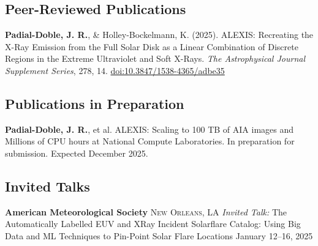 \documentclass[11pt,a4paper]{article}
\begin{document}
\spacedhrule{0.5em}{-0.4em}



\subsection*{Peer-Reviewed Publications}

\begin{enumerate}[leftmargin=2em, itemsep=0.8em, parsep=0pt, label=\textbf{[\arabic*]}]
    \item \textbf{Padial-Doble, J. R.}, \& Holley-Bockelmann, K. (2025). ALEXIS: Recreating the X-Ray Emission from the Full Solar Disk as a Linear Combination of Discrete Regions in the Extreme Ultraviolet and Soft X-Rays. \textit{The Astrophysical Journal Supplement Series}, 278, 14. \href{https://doi.org/10.3847/1538-4365/adbe35}{doi:10.3847/1538-4365/adbe35}
\end{enumerate}

\subsection*{Publications in Preparation}

\begin{enumerate}[leftmargin=2em, itemsep=0.8em, parsep=0pt, label=\textbf{[\arabic*]}]
    \item \textbf{Padial-Doble, J. R.}, et al. ALEXIS: Scaling to 100 TB of AIA images and Millions of CPU hours at National Compute Laboratories. In preparation for submission. Expected December 2025.
\end{enumerate}

\spacedhrule{0.5em}{-0.4em}



\subsection*{Invited Talks}

\headedsection
{\textbf{American Meteorological Society}}
{\textsc{New Orleans, LA}}
{%
    \headedsubsection
    {\textit{Invited Talk:} The Automatically Labelled EUV and XRay Incident Solarflare Catalog: Using Big Data and ML Techniques to Pin-Point Solar Flare Locations}
    {January 12–16, 2025}
    {}
}
\end{document}
